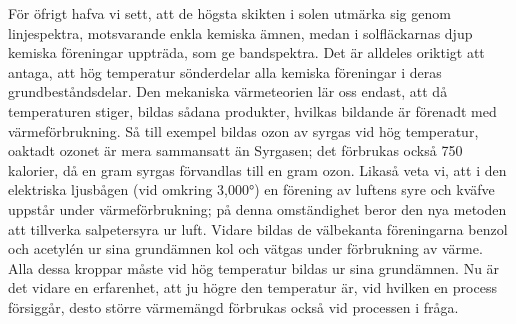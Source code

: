 \documentclass[a4paper, 12pt, oneside, swedish]{article}
\begin{document}
För öfrigt hafva vi sett, att de högsta skikten i solen utmärka sig genom linjespektra, motsvarande enkla kemiska ämnen, medan i solfläckarnas djup kemiska föreningar uppträda, som ge bandspektra. Det är alldeles oriktigt att antaga, att hög temperatur sönderdelar alla kemiska föreningar i deras grundbeståndsdelar. Den mekaniska värmeteorien lär oss endast, att då temperaturen stiger, bildas sådana produkter, hvilkas bildande är förenadt med värmeförbrukning. Så till exempel bildas ozon av syrgas vid hög temperatur, oaktadt ozonet är mera sammansatt än Syrgasen; det förbrukas också 750 kalorier, då en gram syrgas förvandlas till en gram ozon. Likaså veta vi, att i den elektriska ljusbågen (vid omkring 3,000°) en förening av luftens syre och kväfve uppstår under värmeförbrukning; på denna omständighet beror den nya metoden att tillverka salpetersyra ur luft. Vidare bildas de välbekanta föreningarna benzol och acetylén ur sina grundämnen kol och vätgas under förbrukning av värme. Alla dessa kroppar måste vid hög temperatur bildas ur sina grundämnen. Nu är det vidare en erfarenhet, att ju högre den temperatur är, vid hvilken en process försiggår, desto större värmemängd förbrukas också vid processen i fråga.
\end{document}
